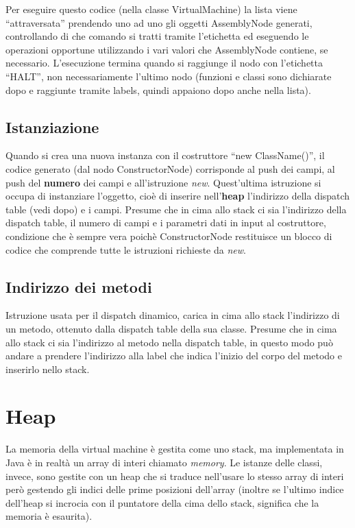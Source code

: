 \documentclass{scrreprt}
\begin{document}
Per eseguire questo codice (nella classe VirtualMachine) la lista viene ``attraversata'' prendendo uno ad uno gli oggetti AssemblyNode generati, controllando di che comando si tratti tramite l'etichetta ed eseguendo le operazioni
opportune utilizzando i vari valori che AssemblyNode contiene, se necessario. L'esecuzione termina quando si raggiunge il nodo con l'etichetta ``HALT'', non necessariamente l'ultimo nodo (funzioni e classi sono dichiarate dopo e raggiunte tramite labels, quindi appaiono dopo anche nella lista).

\subsection{Istanziazione}

Quando si crea una nuova instanza con il costruttore ``new ClassName()'', il codice generato (dal nodo ConstructorNode) corrisponde al push dei campi, al push del \textbf{numero} dei campi e all'istruzione \textit{new}. Quest'ultima 
istruzione si occupa di instanziare l'oggetto, cioè di inserire nell'\textbf{heap} l'indirizzo della dispatch table (vedi dopo) e i campi. Presume che in cima allo stack ci sia l'indirizzo della dispatch table, 
il numero di campi e i parametri dati in input al costruttore, condizione che è sempre vera poichè ConstructorNode restituisce un blocco di codice che comprende tutte le istruzioni richieste da \textit{new}.

\subsection{Indirizzo dei metodi}
Istruzione usata per il dispatch dinamico, carica in cima allo stack l'indirizzo di un metodo, ottenuto dalla
dispatch table della sua classe. Presume che in cima allo stack ci sia l'indirizzo al metodo nella dispatch table, in questo modo può andare a prendere l'indirizzo
alla label che indica l'inizio del corpo del metodo e inserirlo nello stack.


\section{Heap}
La memoria della virtual machine è gestita come uno stack, ma implementata in Java è in realtà un array di interi chiamato \textit{memory}. 
Le istanze delle classi, invece, sono gestite con un heap che si traduce nell'usare lo stesso array di interi però gestendo
gli indici delle prime posizioni dell'array (inoltre se l'ultimo indice dell'heap si incrocia con il puntatore della cima dello stack, significa che la memoria è esaurita).
\end{document}
